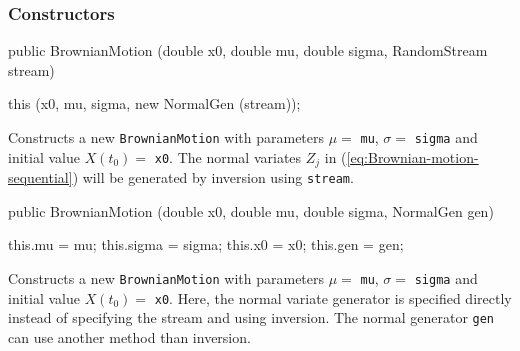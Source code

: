 \subsubsection* {Constructors}
\begin{code}

   public BrownianMotion (double x0, double mu, double sigma,
                          RandomStream stream)\begin{hide} {
        this (x0, mu, sigma, new NormalGen (stream));
    }\end{hide}
\end{code}
\begin{tabb} Constructs a new \texttt{BrownianMotion} with
parameters $\mu =$ \texttt{mu}, $\sigma =$ \texttt{sigma} and initial value
$X(t_{0}) =$ \texttt{x0}.
The normal variates $Z_j$ in (\ref{eq:Brownian-motion-sequential}) will be
generated by inversion using \texttt{stream}.
\end{tabb}
\begin{code}

   public BrownianMotion (double x0, double mu, double sigma, NormalGen gen)\begin{hide} {
        this.mu    = mu;
        this.sigma = sigma;
        this.x0    = x0;
        this.gen   = gen;
    }\end{hide}
\end{code}
\begin{tabb} Constructs a new \texttt{BrownianMotion} with parameters $\mu =$
\texttt{mu}, $\sigma =$ \texttt{sigma} and initial value $X(t_{0}) =$ \texttt{x0}.
Here, the normal variate generator
 is specified
directly instead of specifying the stream and using inversion.
The normal generator \texttt{gen} can use another method than inversion.
\end{tabb}


